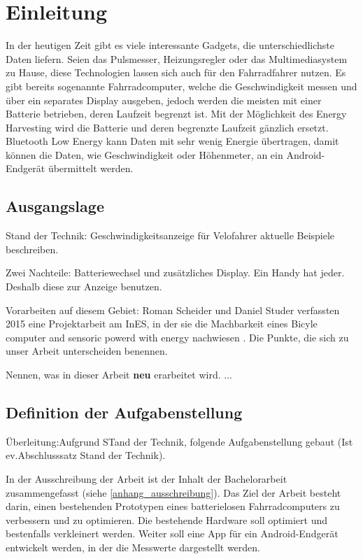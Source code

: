 \chapter{Einleitung}
In der heutigen Zeit gibt es viele interessante Gadgets, die unterschiedlichste Daten liefern. Seien das Pulsmesser, Heizungsregler oder das Multimediasystem zu Hause, diese Technologien lassen sich auch für den Fahrradfahrer nutzen. Es gibt bereits sogenannte Fahrradcomputer, welche die Geschwindigkeit messen und über ein separates Display ausgeben, jedoch werden die meisten mit einer Batterie betrieben, deren Laufzeit begrenzt ist. Mit der Möglichkeit des Energy Harvesting wird die Batterie und deren begrenzte Laufzeit gänzlich ersetzt. Bluetooth Low Energy kann Daten mit sehr wenig Energie übertragen, damit können die Daten, wie Geschwindigkeit oder Höhenmeter, an ein Android-Endgerät übermittelt werden.


\section{Ausgangslage}

Stand der Technik: Geschwindigkeitsanzeige für Velofahrer aktuelle Beispiele beschreiben.

Zwei Nachteile: Batteriewechsel und zusätzliches Display. Ein Handy hat jeder. Deshalb diese zur Anzeige benutzen.



Vorarbeiten auf diesem Gebiet:
Roman Scheider und Daniel Studer verfassten 2015 eine Projektarbeit am InES, in der sie die Machbarkeit eines Bicyle computer and sensoric powerd with energy nachwiesen \cite{PA_bicycle}. 
Die Punkte, die sich zu unser Arbeit unterscheiden benennen.

Nennen, was in dieser Arbeit \textbf{neu} erarbeitet wird.
...



\section{Definition der Aufgabenstellung}
Überleitung:Aufgrund STand der Technik, folgende Aufgabenstellung gebaut (Ist ev.Abschlusssatz Stand der Technik).

In der Ausschreibung der Arbeit ist der Inhalt der Bachelorarbeit zusammengefasst (siehe \ref{anhang_ausschreibung}). Das Ziel der Arbeit besteht darin, einen bestehenden Prototypen eines batterielosen Fahrradcomputers zu verbessern und zu optimieren. Die bestehende Hardware soll optimiert und bestenfalls verkleinert werden. Weiter soll eine App für ein Android-Endgerät entwickelt werden, in der die Messwerte dargestellt werden.

